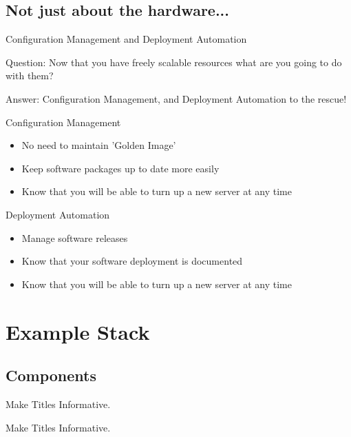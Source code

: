 \documentclass{beamer}
\begin{document}
\subsection{Not just about the hardware...}
\begin{frame}{Configuration Management and Deployment Automation}
  \begin{block}{Question:}
    Now that you have freely scalable resources what are you going to do with them?
  \end{block}
  \begin{block}{Answer:}
    Configuration Management, and Deployment Automation to the rescue!
  \end{block}
\end{frame}

\begin{frame}{Configuration Management}
  \begin{itemize}
  \item No need to maintain 'Golden Image'
  \item Keep software packages up to date more easily
  \item Know that you will be able to turn up a new server at any time
  \end{itemize}
\end{frame}

\begin{frame}{Deployment Automation}
  \begin{itemize}
  \item Manage software releases
  \item Know that your software deployment is documented
  \item Know that you will be able to turn up a new server at any time
  \end{itemize}
\end{frame}

\section{Example Stack}

\subsection{Components}

\begin{frame}{Make Titles Informative.}
\end{frame}

\begin{frame}{Make Titles Informative.}
\end{frame}
\end{document}
